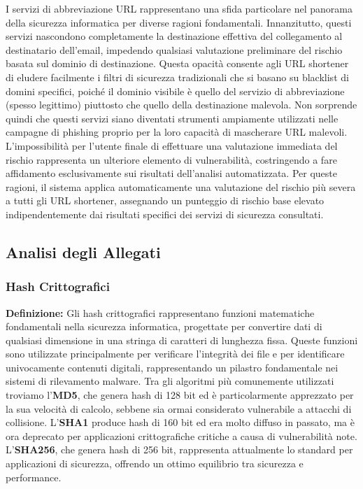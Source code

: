 \documentclass{article}
\begin{document}
I servizi di abbreviazione URL rappresentano una sfida particolare nel panorama della sicurezza informatica per diverse ragioni fondamentali. Innanzitutto, questi servizi nascondono completamente la destinazione effettiva del collegamento al destinatario dell'email, impedendo qualsiasi valutazione preliminare del rischio basata sul dominio di destinazione.
\newline \newline
Questa opacità consente agli URL shortener di eludere facilmente i filtri di sicurezza tradizionali che si basano su blacklist di domini specifici, poiché il dominio visibile è quello del servizio di abbreviazione (spesso legittimo) piuttosto che quello della destinazione malevola. Non sorprende quindi che questi servizi siano diventati strumenti ampiamente utilizzati nelle campagne di phishing proprio per la loro capacità di mascherare URL malevoli.
\newline \newline
L'impossibilità per l'utente finale di effettuare una valutazione immediata del rischio rappresenta un ulteriore elemento di vulnerabilità, costringendo a fare affidamento esclusivamente sui risultati dell'analisi automatizzata. Per queste ragioni, il sistema applica automaticamente una valutazione del rischio più severa a tutti gli URL shortener, assegnando un punteggio di rischio base elevato indipendentemente dai risultati specifici dei servizi di sicurezza consultati.

\subsection{Analisi degli Allegati}

\subsubsection{Hash Crittografici}
\textbf{Definizione:} Gli hash crittografici rappresentano funzioni matematiche fondamentali nella sicurezza informatica, progettate per convertire dati di qualsiasi dimensione in una stringa di caratteri di lunghezza fissa. Queste funzioni sono utilizzate principalmente per verificare l'integrità dei file e per identificare univocamente contenuti digitali, rappresentando un pilastro fondamentale nei sistemi di rilevamento malware.
\newline \newline
Tra gli algoritmi più comunemente utilizzati troviamo l'\textbf{MD5}, che genera hash di 128 bit ed è particolarmente apprezzato per la sua velocità di calcolo, sebbene sia ormai considerato vulnerabile a attacchi di collisione. L'\textbf{SHA1} produce hash di 160 bit ed era molto diffuso in passato, ma è ora deprecato per applicazioni crittografiche critiche a causa di vulnerabilità note. L'\textbf{SHA256}, che genera hash di 256 bit, rappresenta attualmente lo standard per applicazioni di sicurezza, offrendo un ottimo equilibrio tra sicurezza e performance.
\end{document}
